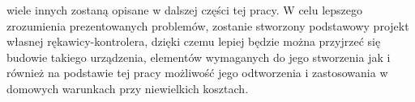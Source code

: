 wiele innych zostaną opisane w dalszej części tej pracy. W celu lepszego zrozumienia prezentowanych problemów, zostanie stworzony podstawowy projekt własnej rękawicy-kontrolera, dzięki czemu lepiej będzie można przyjrzeć się budowie takiego urządzenia, elementów wymaganych do jego stworzenia jak i również na podstawie tej pracy możliwość jego odtworzenia i zastosowania w domowych warunkach przy niewielkich kosztach.